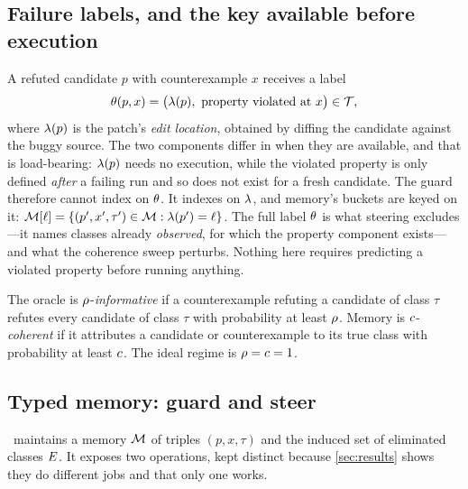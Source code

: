 \subsection{Failure labels, and the key available before execution}
A refuted candidate $p$ with counterexample $x$ receives a label
\begin{equation}
\theta(p, x) = \big(\lambda(p),\ \text{property violated at } x\big) \in \mathcal{T} ,
\label{eq:type}
\end{equation}
where $\lambda(p)$ is the patch's \emph{edit location}, obtained by diffing the
candidate against the buggy source. The two components differ in when they are
available, and that is load-bearing: $\lambda(p)$ needs no execution, while the
violated property is only defined \emph{after} a failing run and so does not
exist for a fresh candidate. The guard therefore cannot index on $\theta$. It
indexes on $\lambda$, and memory's buckets are keyed on it:
$\mathcal{M}[\ell] = \{(p', x', \tau') \in \mathcal{M} : \lambda(p') = \ell\}$. The full label
$\theta$ is what steering excludes---it names classes already \emph{observed},
for which the property component exists---and what the coherence sweep
perturbs. Nothing here requires predicting a violated property before running
anything.

\begin{definition}
\label{def:coh}
The oracle is $\rho$-\emph{informative} if a counterexample refuting a
candidate of class $\tau$ refutes every candidate of class $\tau$ with
probability at least $\rho$. Memory is $c$-\emph{coherent} if it attributes
a candidate or counterexample to its true class with probability at least
$c$. The ideal regime is $\rho = c = 1$.
\end{definition}

\subsection{Typed memory: guard and steer}
\CEGMem\ maintains a memory $\mathcal{M}$ of triples $(p, x, \tau)$ and the induced
set of eliminated classes $E$. It exposes two operations, kept distinct
because \cref{sec:results} shows they do different jobs and that only one
works.

